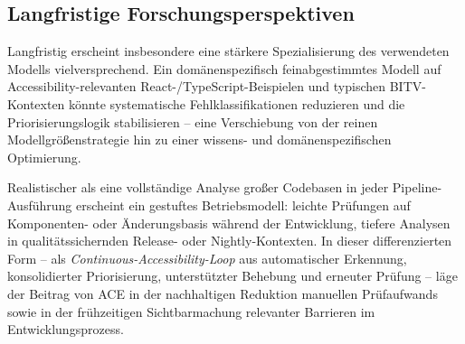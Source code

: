 \subsection{Langfristige Forschungsperspektiven}
\label{sec:ausblick_lang}

Langfristig erscheint insbesondere eine stärkere Spezialisierung des verwendeten Modells vielversprechend. Ein domänenspezifisch feinabgestimmtes Modell auf Accessibility-relevanten React-/TypeScript-Beispielen und typischen \ac{BITV}-Kontexten könnte systematische Fehlklassifikationen reduzieren und die Priorisierungslogik stabilisieren -- eine Verschiebung von der reinen Modell\-größenstrategie hin zu einer wissens- und domänenspezifischen Optimierung.

Realistischer als eine vollständige Analyse großer Codebasen in jeder Pipeline-Ausführung erscheint ein gestuftes Betriebsmodell: leichte Prüfungen auf Komponenten- oder Änderungsbasis während der Entwicklung, tiefere Analysen in qualitätssichernden Release- oder Nightly-Kontexten. In dieser differenzierten Form -- als \textit{Continuous-Accessibility-Loop} aus automatischer Erkennung, konsolidierter Priorisierung, unterstützter Behebung und erneuter Prüfung -- läge der Beitrag von \ac{ACE} in der nachhaltigen Reduktion manuellen Prüfaufwands sowie in der frühzeitigen Sichtbarmachung relevanter Barrieren im Entwicklungsprozess.